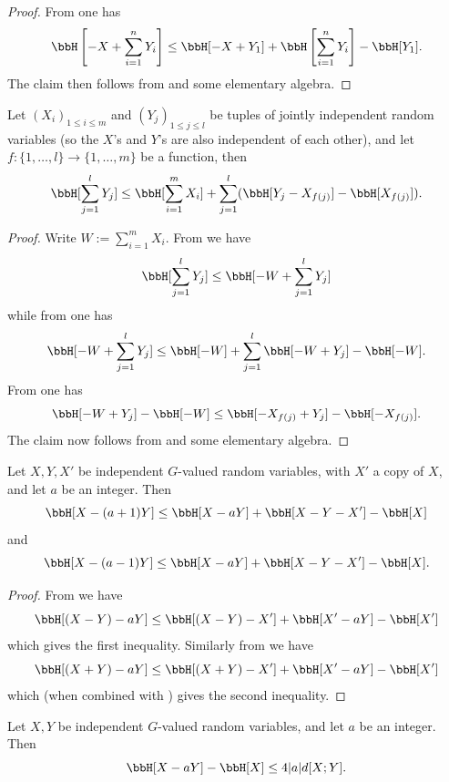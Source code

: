 \begin{proof}\leanok
  From  one has
  $$ \bbH\left[-X + \sum_{i=1}^n Y_i\right] \leq \bbH[ - X + Y_1 ] + \bbH\left[ \sum_{i=1}^n Y_i \right] - \bbH[Y_1].$$
  The claim then follows from  and some elementary algebra.
\end{proof}

\begin{lemma}\label{compare-sums}\leanok  Let $(X_i)_{1 \leq i \leq m}$ and $(Y_j)_{1 \leq j \leq l}$ be tuples of jointly independent random variables (so the $X$'s and $Y$'s are also independent of each other), and let $f: \{1,\dots,l\} \to \{1,\dots,m\}$ be a function, then
  $$ \bbH[\sum_{j=1}^l Y_j] \leq \bbH[ \sum_{i=1}^m X_i ] + \sum_{j=1}^l (\bbH[ Y_j - X_{f(j)}] - \bbH[X_{f(j)}]).$$
\end{lemma}

\begin{proof}\leanok  Write $W := \sum_{i=1}^m X_i$.  From  we have
$$ \bbH[\sum_{j=1}^l Y_j]  \leq \bbH[-W + \sum_{j=1}^l Y_j]$$
while from  one has
$$ \bbH[-W + \sum_{j=1}^l Y_j] \leq \bbH[-W] + \sum_{j=1}^l \bbH[-W + Y_j] - \bbH[-W].$$
From  one has
$$ \bbH[-W + Y_j] - \bbH[-W] \leq \bbH[-X_{f(j)} + Y_j] - \bbH[-X_{f(j)}].$$
The claim now follows from  and some elementary algebra.
\end{proof}

\begin{lemma}
  \label{sum-dilate-I}
  \leanok

  Let $X,Y,X'$ be independent $G$-valued random variables, with $X'$ a copy of $X$,
  and let $a$ be an integer.  Then
  $$\bbH[X-(a+1)Y] \leq \bbH[X-aY] + \bbH[X-Y-X'] - \bbH[X]$$
  and
  $$\bbH[X-(a-1)Y] \leq \bbH[X-aY] + \bbH[X-Y-X'] - \bbH[X].$$
\end{lemma}
\begin{proof}
  \leanok

  From  we have
  $$ \bbH[(X-Y)-aY] \leq \bbH[(X-Y) - X'] + \bbH[X'-aY] - \bbH[X']$$
  which gives the first inequality.  Similarly from  we have
  $$ \bbH[(X+Y)-aY] \leq \bbH[(X+Y) - X'] + \bbH[X'-aY] - \bbH[X']$$
  which (when combined with ) gives the second inequality.
\end{proof}

\begin{lemma}\label{sum-dilate-II}\leanok  Let $X,Y$ be independent $G$-valued random variables, and let $a$ be an integer.  Then
  $$\bbH[X-aY] - \bbH[X] \leq 4 |a| d[X;Y].$$
\end{lemma}

